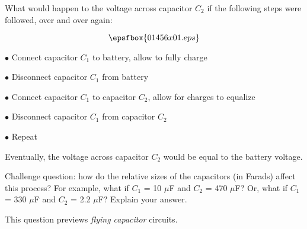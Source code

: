

What would happen to the voltage across capacitor $C_2$ if the following steps were followed, over and over again:

$$\epsfbox{01456x01.eps}$$

\medskip
\item{$\bullet$} Connect capacitor $C_1$ to battery, allow to fully charge
\item{$\bullet$} Disconnect capacitor $C_1$ from battery
\item{$\bullet$} Connect capacitor $C_1$ to capacitor $C_2$, allow for charges to equalize
\item{$\bullet$} Disconnect capacitor $C_1$ from capacitor $C_2$
\item{$\bullet$} Repeat
\medskip







Eventually, the voltage across capacitor $C_2$ would be equal to the battery voltage.

\vskip 10pt

Challenge question: how do the relative sizes of the capacitors (in Farads) affect this process?  For example, what if $C_1$ = 10 $\mu$F and $C_2$ = 470 $\mu$F?  Or, what if $C_1$ = 330 $\mu$F and $C_2$ = 2.2 $\mu$F?  Explain your answer.







This question previews {\it flying capacitor} circuits.




